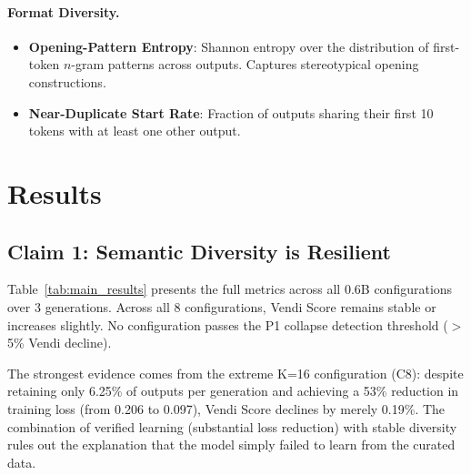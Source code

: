 \documentclass[11pt,a4paper]{article}
\begin{document}
\paragraph{Format Diversity.}
\begin{itemize}
    \item \textbf{Opening-Pattern Entropy}: Shannon entropy over the distribution of first-token $n$-gram patterns across outputs. Captures stereotypical opening constructions.
    \item \textbf{Near-Duplicate Start Rate}: Fraction of outputs sharing their first 10 tokens with at least one other output.
\end{itemize}

\section{Results}

\subsection{Claim 1: Semantic Diversity is Resilient}

Table~\ref{tab:main_results} presents the full metrics across all 0.6B configurations over 3 generations. Across all 8 configurations, Vendi Score remains stable or increases slightly. No configuration passes the P1 collapse detection threshold ($>$5\% Vendi decline).

The strongest evidence comes from the extreme K=16 configuration (C8): despite retaining only 6.25\% of outputs per generation and achieving a 53\% reduction in training loss (from 0.206 to 0.097), Vendi Score declines by merely 0.19\%. The combination of verified learning (substantial loss reduction) with stable diversity rules out the explanation that the model simply failed to learn from the curated data.
\end{document}
